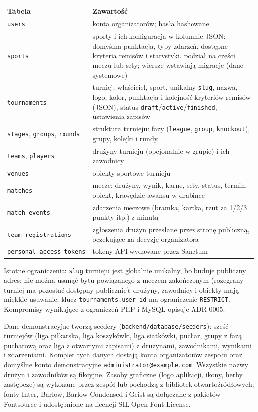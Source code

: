 \documentclass[11pt,a4paper,oneside]{article}
\begin{document}
\begin{tabularx}{\textwidth}{@{}>{\raggedright\arraybackslash}p{} Y@{}}
\toprule
Tabela & Zawartość\\
\midrule
\texttt{users} & konta organizatorów; hasła hashowane\\
\texttt{sports} & sporty i ich konfiguracja w kolumnie JSON: domyślna punktacja, typy zdarzeń, dostępne kryteria remisów i statystyki, podział na części meczu lub sety; wiersze wstawiają migracje (dane systemowe)\\
\texttt{tournaments} & turniej: właściciel, sport, unikalny \texttt{slug}, nazwa, logo, kolor, punktacja i kolejność kryteriów remisów (JSON), status \texttt{draft}/\texttt{active}/\texttt{finished}, ustawienia zapisów\\
\texttt{stages}, \texttt{groups}, \texttt{rounds} & struktura turnieju: fazy (\texttt{league}, \texttt{group}, \texttt{knockout}), grupy, kolejki i rundy\\
\texttt{teams}, \texttt{players} & drużyny turnieju (opcjonalnie w grupie) i ich zawodnicy\\
\texttt{venues} & obiekty sportowe turnieju\\
\texttt{matches} & mecze: drużyny, wynik, karne, sety, status, termin, obiekt, krawędzie awansu w drabince\\
\texttt{match\_events} & zdarzenia meczowe (bramka, kartka, rzut za 1/2/3 punkty itp.) z minutą\\
\texttt{team\_registrations} & zgłoszenia drużyn przesłane przez stronę publiczną, oczekujące na decyzję organizatora\\
\texttt{personal\_access\_tokens} & tokeny API wydawane przez Sanctum\\
\bottomrule
\end{tabularx}

Istotne ograniczenia: \texttt{slug} turnieju jest globalnie unikalny, bo buduje publiczny adres; nie można usunąć bytu powiązanego z meczem zakończonym (rozegrany turniej ma pozostać dostępny publicznie); drużyny, zawodnicy i obiekty mają miękkie usuwanie; klucz \texttt{tournaments.user\_id} ma ograniczenie \texttt{RESTRICT}. Kompromisy wynikające z ograniczeń PHP i MySQL opisuje ADR 0005.

Dane demonstracyjne tworzą seedery (\texttt{backend/database/seeders}): sześć turniejów (liga piłkarska, liga koszykówki, liga siatkówki, puchar, grupy z fazą pucharową oraz liga z otwartymi zapisami) z drużynami, zawodnikami, wynikami i zdarzeniami. Komplet tych danych dostają konta organizatorów zespołu oraz domyślne konto demonstracyjne \texttt{administrator@example.com}. Wszystkie nazwy drużyn i zawodników są fikcyjne. Zasoby graficzne (logo aplikacji, ikony, herby zastępcze) są wykonane przez zespół lub pochodzą z bibliotek otwartoźródłowych; fonty Inter, Barlow, Barlow Condensed i Geist są dołączane z pakietów Fontsource i udostępnione na licencji SIL Open Font License.
\end{document}

